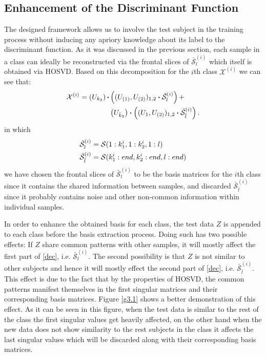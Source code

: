 \documentclass[journal]{IEEEtran}
\begin{document}
	\subsection{Enhancement of the Discriminant Function}
	The designed framework allows us to involve the test subject in the training process without inducing any apriory knowledge about its label to the discriminant function. As it was discussed in the previous section, each sample in a class can ideally be reconstructed via the frontal slices of $\bar{\mathcal{S}}^{(i)}_l$ which itself is obtained via HOSVD. Based on this decomposition for the $i$th class $\mathcal{X}^{(i)}$ we can see that: 
	\begin{align}
	\mathcal{X}^{(i)} = \left( U_{k_3} \right)\boldsymbol{\cdot} &\left(  
	(U_{(1)}, U_{(2)})_{1,2}\boldsymbol{\cdot} \bar{\mathcal{S}}^{(i)}_l
	\right)	+ \notag \\
	&\left( U_{\bar{k}_3} \right)\boldsymbol{\cdot}
	\left(  
	(U_{1}, U_{(2)})_{1,2}\boldsymbol{\cdot} \bar{\mathcal{S}}^{(i)}_{\bar{l}} 
	\right). \label{dec}
	\end{align}
	in which
	\begin{align}
	\bar{\mathcal{S}}^{(i)}_l &= \mathcal{S}(1:k_1^i, 1:k_2^i, 1:l)\notag
	\\
	\bar{\mathcal{S}}^{(i)}_{\bar{l}} &= \mathcal{S}(k_1^i:end, k_2^i:end, l:end)\notag
	\end{align}
	we have chosen the frontal slices of $\bar{\mathcal{S}}^{(i)}_l$ to be the basis matrices for the $i $th class since it contains the shared information between samples, and discarded $\bar{\mathcal{S}}^{(i)}_{\bar{l}}$ since it probably contains noise and other non-common information within individual samples. 
	
	In order to enhance the obtained basis for each class, the test data $Z$ is appended to each class before the basis extraction process. Doing such has two possible effects: If $Z$ share common patterns with other samples, it will mostly affect the first part of \eqref{dec}, i.e. $\bar{\mathcal{S}}^{(i)}_l$. The second possibility is that $Z$ is not similar to other subjects and hence it will mostly effect the second part of \eqref{dec}, i.e. $\bar{\mathcal{S}}^{(i)}_{\bar{l}}$. This effect is due to the fact that by the properties of HOSVD, the common patterns manifest themselves in the first singular matrices and their corresponding basis matrices. Figure \eqref{g3.1} shows a better demonstration of this effect. As it can be seen in this figure, when the test data is similar to the rest of the class the first singular values get heavily affected, on the other hand when the new data does not show similarity to the rest subjects in the class it affects the last singular values which will be discarded along with their corresponding basis matrices.
	
\end{document}
